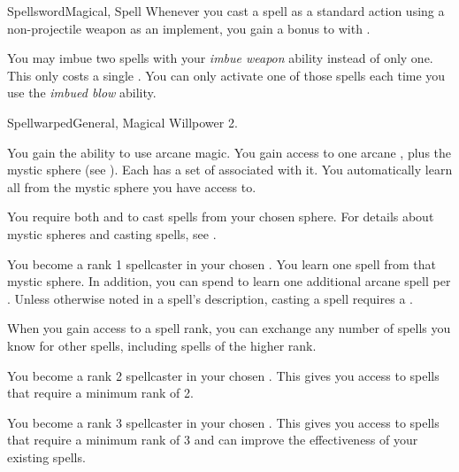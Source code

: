 \begin{feat}{Spellsword}{Magical, Spell}
         Whenever you cast a spell as a standard action using a non-projectile weapon as an implement, you  gain a  bonus to  with .

         You may imbue two spells with your \textit{imbue weapon} ability instead of only one.
        This only costs a single .
        You can only activate one of those spells each time you use the \textit{imbued blow} ability.
    \end{feat}

    \begin{feat}{Spellwarped}{General, Magical}
        \featpre Willpower 2.

         You gain the ability to use arcane magic.
        You gain access to one arcane , plus the  mystic sphere (see ).
        Each  has a set of  associated with it.
        You automatically learn all  from the mystic sphere you have access to.

        You require both  and  to cast spells from your chosen sphere.
        For details about mystic spheres and casting spells, see .

         You become a rank 1 spellcaster in your chosen .
        You learn one spell from that mystic sphere.
        In addition, you can spend  to learn one additional arcane spell per .
        Unless otherwise noted in a spell's description, casting a spell requires a .

        When you gain access to a spell rank,
            you can exchange any number of spells you know for other spells,
            including spells of the higher rank.

         You become a rank 2 spellcaster in your chosen .
        This gives you access to spells that require a minimum rank of 2.

         You become a rank 3 spellcaster in your chosen .
        This gives you access to spells that require a minimum rank of 3 and can improve the effectiveness of your existing spells.


\end{feat}
